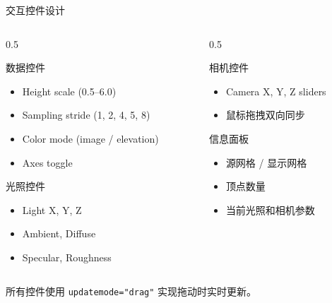 \documentclass[aspectratio=169,11pt]{ctexbeamer}
\begin{document}
\begin{frame}{交互控件设计}

  \begin{columns}
    \begin{column}{0.5\linewidth}
      \begin{block}{数据控件}
        \begin{itemize}
          \item Height scale (0.5--6.0)
          \item Sampling stride (1, 2, 4, 5, 8)
          \item Color mode (image / elevation)
          \item Axes toggle
        \end{itemize}
      \end{block}
      \begin{block}{光照控件}
        \begin{itemize}
          \item Light X, Y, Z
          \item Ambient, Diffuse
          \item Specular, Roughness
        \end{itemize}
      \end{block}
    \end{column}
    \begin{column}{0.5\linewidth}
      \begin{block}{相机控件}
        \begin{itemize}
          \item Camera X, Y, Z sliders
          \item 鼠标拖拽双向同步
        \end{itemize}
      \end{block}
      \begin{block}{信息面板}
        \begin{itemize}
          \item 源网格 / 显示网格
          \item 顶点数量
          \item 当前光照和相机参数
        \end{itemize}
      \end{block}
    \end{column}
  \end{columns}

  \begin{center}
    所有控件使用 \texttt{updatemode="drag"} 实现拖动时实时更新。
  \end{center}
\end{frame}
\end{document}
